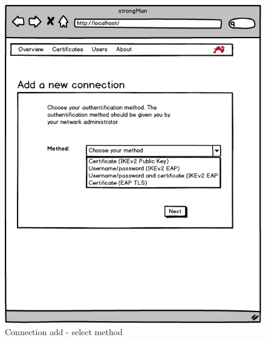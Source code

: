 \begin{figure}[H]
	\centering
	\includegraphics[width=400pt]{images/mockups/con_config1.png}
	\caption{Connection add - select method}
\end{figure}

